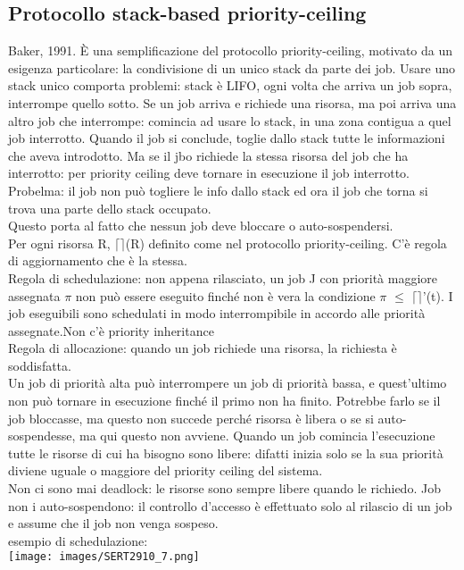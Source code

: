 \documentclass[18px]{article}
\begin{document}
\subsection{Protocollo stack-based priority-ceiling}
Baker, 1991. È una semplificazione del protocollo priority-ceiling, motivato da un esigenza particolare: la condivisione di un unico stack da parte dei job. Usare uno stack unico comporta problemi: stack è LIFO, ogni volta che arriva un job sopra, interrompe quello sotto. Se un job arriva e richiede una risorsa, ma poi arriva una altro job che interrompe: comincia ad usare lo stack, in una zona contigua a quel job interrotto. Quando il job si conclude, toglie dallo stack tutte le informazioni che aveva introdotto. Ma se il jbo richiede la stessa risorsa del job che ha interrotto: per priority ceiling deve tornare in esecuzione il job interrotto. Probelma: il job non può togliere le info dallo stack ed ora il job che torna si trova una parte dello stack occupato.\\ Questo porta al fatto che nessun job deve bloccare o auto-sospendersi.\\ Per ogni risorsa R, $\lceil\rceil$(R) definito come nel protocollo priority-ceiling. C'è regola di aggiornamento che  è la stessa. \\ Regola di schedulazione: non appena rilasciato, un job J con priorità maggiore assegnata $\pi$ non può essere eseguito finché non è vera la condizione $\pi$ $\leq$ $\lceil\rceil$'(t). I job eseguibili sono schedulati in modo interrompibile in accordo alle priorità assegnate.Non c'è priority inheritance\\ Regola di allocazione: quando un job richiede una risorsa, la richiesta è soddisfatta.\\ Un job di priorità alta può interrompere un job di priorità bassa, e quest'ultimo non può tornare in esecuzione finché il primo non ha finito. Potrebbe farlo se il job bloccasse, ma questo non succede perché risorsa è libera o se si auto-sospendesse, ma qui questo non avviene. Quando un job comincia l'esecuzione tutte le risorse di cui ha bisogno sono libere: difatti inizia solo se la sua priorità diviene uguale o maggiore del priority ceiling del sistema.\\ Non ci sono mai deadlock: le risorse sono sempre libere quando le richiedo. Job non i auto-sospendono: il controllo d'accesso è effettuato solo al rilascio di un job e assume che il job non venga sospeso.\\ esempio di schedulazione:\\
\texttt{[image: images/SERT2910\_7.png]}
\end{document}
